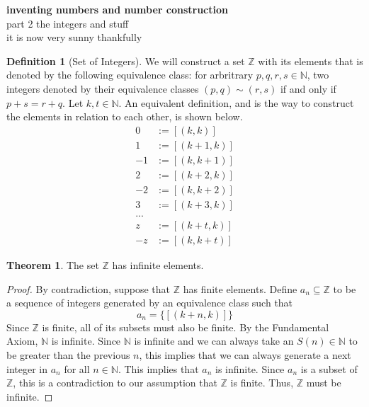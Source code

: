 \documentclass[12pt]{article}
\theoremstyle{definition}
\newtheorem{theorem}{Theorem}
\newtheorem{definition}{Definition}
\begin{document}
\begin{center}
    \large \textbf{inventing numbers and number construction} \\
    {part 2 the integers and stuff} \\

    {\small it is now very sunny thankfully\\}
\end{center}

\begin{definition}[Set of Integers] We will construct a set $\mathbb{Z}$ with its elements that is denoted by the following equivalence class: for arbritrary $p, q, r, s \in \mathbb{N}$, two integers denoted by their equivalence classes $(p, q)\sim (r, s)$ if and only if \(p + s = r + q\). Let $k, t \in \mathbb{N}$. An equivalent definition, and is the way to construct the elements in relation to each other, is shown below.
    \begin{align*}
        0 &:= [(k, k)] \\ 
        1 &:= [(k + 1, k)] \\
        -1 &:= [(k, k + 1)] \\
        2 &:= [(k + 2, k)] \\
        -2 &:= [(k, k + 2)] \\
        3 &:= [(k + 3, k)] \\
        ... \\
        z &:=  [(k + t, k)] \\ 
        -z &:=  [(k, k + t)]
    \end{align*}
\end{definition}

\begin{theorem}
    The set $\mathbb{Z}$ has infinite elements. 
\end{theorem}
\begin{proof}
    By contradiction, suppose that $\mathbb{Z}$ has finite elements. Define $a_n \subseteq \mathbb{Z}$ to be a sequence of integers generated by an equivalence class such that 
    \begin{equation*}
        a_n = \{[(k + n, k)]\}
    \end{equation*}
    Since $\mathbb{Z}$ is finite, all of its subsets must also be finite. By the Fundamental Axiom, $\mathbb{N}$ is infinite. Since $\mathbb{N}$ is infinite and we can always take an $S(n) \in \mathbb{N}$ to be greater than the previous $n$, this implies that we can always generate a next integer in $a_n$ for all $n \in \mathbb{N}$. This implies that $a_n$ is infinite. Since $a_n$ is a subset of $\mathbb{Z}$, this is a contradiction to our assumption that $\mathbb{Z}$ is finite. Thus, $\mathbb{Z}$ must be infinite.
\end{proof}
\end{document}
